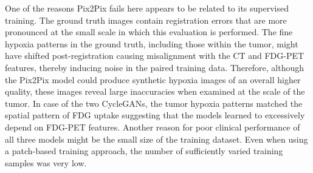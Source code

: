 One of the reasons Pix2Pix fails here appears to be related to its supervised training. The ground truth images contain registration errors that are more pronounced at the small scale in which this evaluation is performed. The fine hypoxia patterns in the ground truth, including those within the tumor, might have shifted post-registration causing misalignment with the CT and FDG-PET features, thereby inducing noise in the paired training data. Therefore, although the Pix2Pix model could produce synthetic hypoxia images of an overall higher quality, these images reveal large inaccuracies when examined at the scale of the tumor.
In case of the two CycleGANs, the tumor hypoxia patterns matched the spatial pattern of FDG uptake suggesting that the models learned to excessively depend on FDG-PET features. Another reason for poor clinical performance of all three models might be the small size of the training dataset. Even when using a patch-based training approach, the number of sufficiently varied training samples was very low. 
